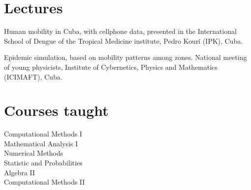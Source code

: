 \documentclass[11pt]{article} %
\begin{document}


\section*{Lectures}

 Human mobility in Cuba, with cellphone data, presented in the International School of Dengue of the Tropical Medicine institute, Pedro Kour\'i (IPK), Cuba.

 Epidemic simulation, based on mobility patterns among zones. National meeting of young physicists, Institute of Cybernetics, Physics and Mathematics (ICIMAFT), Cuba.








\section*{Courses taught}

 Computational Methods I\\
 Mathematical Analysis I\\
 Numerical Methods\\
 Statistic and Probabilities\\
 Algebra II \\
 Computational Methods II
\end{document}
